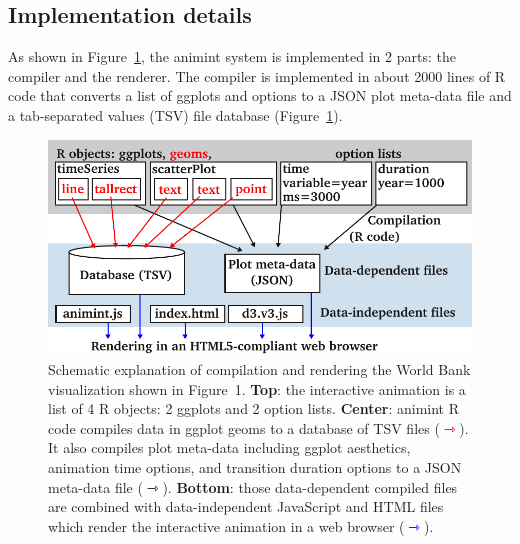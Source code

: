 \documentclass[journal]{vgtc}\usepackage[]{graphicx}\usepackage[]{color}
\begin{document}
\subsection{Implementation details}
\label{sec:implementation}

As shown in Figure~\ref{fig:design}, the animint system is implemented
in 2 parts: the compiler and the renderer. The compiler is implemented in about 
2000 lines of R code that converts a list of ggplots and options to a JSON 
plot meta-data file and a tab-separated values (TSV) file database
(Figure~\ref{fig:design}).

\begin{figure}[htp]
  \centering
  \includegraphics[width=\columnwidth]{figure-design}
  \caption{Schematic explanation of compilation and rendering the
    World Bank visualization shown in Figure~1. \textbf{Top}: the
    interactive animation is a list of 4 R objects: 2 ggplots and 2
    option lists. \textbf{Center}: animint R code compiles data in
    ggplot geoms to a database of TSV files
    (\textcolor{red}{$\rightarrowtriangle$}). It also compiles plot
    meta-data including ggplot aesthetics, animation time
    options, and transition duration options to a JSON meta-data file
    ($\rightarrowtriangle$). \textbf{Bottom}: those data-dependent
    compiled files are combined with data-independent JavaScript and
    HTML files which render the interactive animation in a web browser
    (\textcolor{blue}{$\rightarrowtriangle$}).}
  \label{fig:design}
\end{figure}
\end{document}
